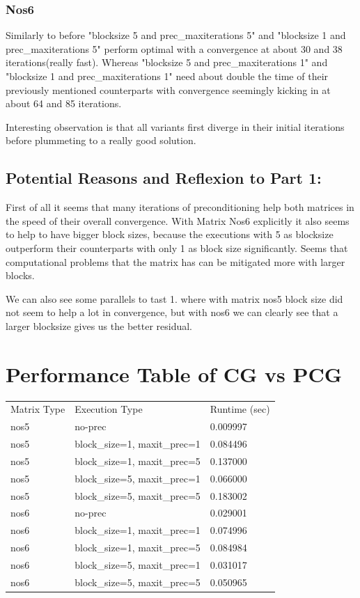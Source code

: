 \documentclass{article}
\begin{document}
\subsubsection*{Nos6} 

Similarly to before "blocksize 5 and prec\_maxiterations 5" and "blocksize 1 and prec\_maxiterations 5" perform optimal with a convergence at about 30 and 38 iterations(really fast). Whereas "blocksize 5 and prec\_maxiterations 1" and "blocksize 1 and prec\_maxiterations 1" need about double the time of their previously mentioned counterparts with convergence seemingly kicking in at about 64 and 85 iterations.

Interesting observation is that all variants first diverge in their initial iterations before plummeting to a really good solution.

\subsection*{Potential Reasons and Reflexion to Part 1:}

First of all it seems that many iterations of preconditioning help both matrices in the speed of their overall convergence. With Matrix Nos6 explicitly it also seems to help to have bigger block sizes, because the executions with 5 as blocksize outperform their counterparts with only 1 as block size significantly. Seems that computational problems that the matrix has can be mitigated more with larger blocks.

We can also see some parallels to tast 1. where with matrix nos5 block size did not seem to help a lot in convergence, but with nos6 we can clearly see that a larger blocksize gives us the better residual.

\section*{Performance Table of CG vs PCG}

\begin{table}
\centering

\begin{tabular}{l l l}
Matrix Type & Execution Type & Runtime (sec) \\
nos5 & no-prec & 0.009997 \\
nos5 & block\_size=1, maxit\_prec=1 & 0.084496 \\
nos5 & block\_size=1, maxit\_prec=5 & 0.137000 \\
nos5 & block\_size=5, maxit\_prec=1 & 0.066000 \\
nos5 & block\_size=5, maxit\_prec=5 & 0.183002 \\
nos6 & no-prec & 0.029001 \\
nos6 & block\_size=1, maxit\_prec=1 & 0.074996 \\
nos6 & block\_size=1, maxit\_prec=5 & 0.084984 \\
nos6 & block\_size=5, maxit\_prec=1 & 0.031017 \\
nos6 & block\_size=5, maxit\_prec=5 & 0.050965 \\

\end{tabular}

\end{table}
\end{document}
